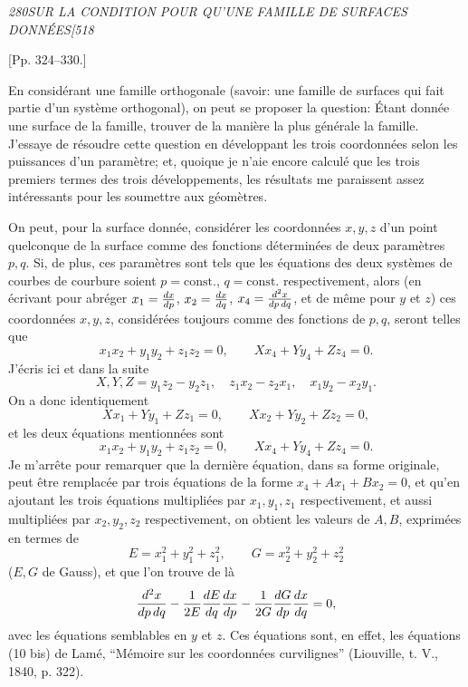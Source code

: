 \documentclass[11pt]{article}
\newcommand{\phead}[3]{\noindent\textit{#1\hfill #2\hfill #3}\par\medskip}
\begin{document}
\clearpage

\phead{280}{SUR LA CONDITION POUR QU'UNE FAMILLE DE SURFACES DONN\'EES}{[518}

\begin{center}[Pp. 324--330.]\end{center}

En consid\'erant une famille orthogonale (savoir: une famille de surfaces qui fait partie
d'un syst\`eme orthogonal), on peut se proposer la question: \'Etant donn\'ee une surface
de la famille, trouver de la mani\`ere la plus g\'en\'erale la famille. J'essaye de r\'esoudre
cette question en d\'eveloppant les trois coordonn\'ees selon les puissances d'un
param\`etre; et, quoique je n'aie encore calcul\'e que les trois premiers termes des trois
d\'eveloppements, les r\'esultats me paraissent assez int\'eressants pour les soumettre aux
g\'eom\`etres.

On peut, pour la surface donn\'ee, consid\'erer les coordonn\'ees $x,y,z$ d'un point
quelconque de la surface comme des fonctions d\'etermin\'ees de deux param\`etres $p,q$.
Si, de plus, ces param\`etres sont tels que les \'equations des deux syst\`emes de courbes
de courbure soient $p=\mathrm{const.}$, $q=\mathrm{const.}$ respectivement, alors (en \'ecrivant pour
abr\'eger $x_1={dx\over dp}$, $x_2={dx\over dq}$, $x_4={d^2x\over dp\,dq}$, et de m\^eme
pour $y$ et $z$) ces coordonn\'ees $x,y,z$, consid\'er\'ees toujours comme des fonctions de
$p,q$, seront telles que
\[
x_1x_2+y_1y_2+z_1z_2=0,\qquad
Xx_4+Yy_4+Zz_4=0.
\]
J'\'ecris ici et dans la suite
\[
X,Y,Z=y_1z_2-y_2z_1,\quad z_1x_2-z_2x_1,\quad x_1y_2-x_2y_1.
\]
On a donc identiquement
\[
Xx_1+Yy_1+Zz_1=0,\qquad Xx_2+Yy_2+Zz_2=0,
\]
et les deux \'equations mentionn\'ees sont
\[
x_1x_2+y_1y_2+z_1z_2=0,\qquad Xx_4+Yy_4+Zz_4=0.
\]
Je m'arr\^ete pour remarquer que la derni\`ere \'equation, dans sa forme originale, peut
\^etre remplac\'ee par trois \'equations de la forme $x_4+Ax_1+Bx_2=0$, et qu'en ajoutant
les trois \'equations multipli\'ees par $x_1,y_1,z_1$ respectivement, et aussi multipli\'ees
par $x_2,y_2,z_2$ respectivement, on obtient les valeurs de $A,B$, exprim\'ees en termes
de
\[
E=x_1^2+y_1^2+z_1^2,\qquad G=x_2^2+y_2^2+z_2^2
\]
($E,G$ de Gauss), et que l'on trouve de l\`a
\[
{d^2x\over dp\,dq}-{1\over2E}{dE\over dq}{dx\over dp}
-{1\over2G}{dG\over dp}{dx\over dq}=0,
\]
avec les \'equations semblables en $y$ et $z$. Ces \'equations sont, en effet, les \'equations
(10 bis) de Lam\'e, ``M\'emoire sur les coordonn\'ees curvilignes'' (Liouville, t. V.,
1840, p. 322).
\end{document}
